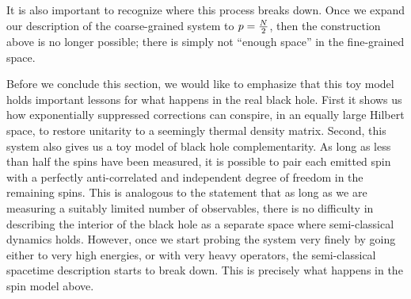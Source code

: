 It is also important to recognize where this process breaks down. Once we expand our description of the coarse-grained system to $p = {N \over 2}$, then the construction above is no longer possible; there is simply not ``enough space'' in the fine-grained space. 

Before we conclude this section, we would like to emphasize that this toy model holds important lessons for what happens in the real black hole. First it shows us how exponentially suppressed corrections can conspire, in an equally large Hilbert space, to restore unitarity to a seemingly thermal density matrix. Second, this system also gives us a toy model of black hole complementarity.  As long as less than half the spins have been measured, it is possible to pair each emitted spin with a perfectly anti-correlated and independent degree of freedom in the remaining spins. This is analogous to the statement that as long as we are measuring a suitably limited number of observables, there is no difficulty in describing the interior of the black hole as a separate space where semi-classical dynamics holds. However, once we start probing the system very finely by going either to very high energies, or with very heavy operators, the semi-classical spacetime description starts to break down. This is precisely what 
happens 
in the spin model above.  


